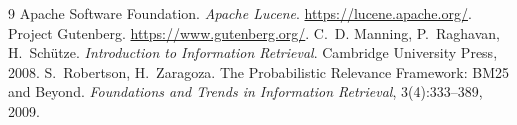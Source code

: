 \documentclass[10pt,a4paper,twocolumn]{article}
\begin{document}
\begin{thebibliography}{9}
\footnotesize\setlength{\itemsep}{1pt}\setlength{\parskip}{0pt}
 Apache Software Foundation. \emph{Apache Lucene}. \url{https://lucene.apache.org/}.
 Project Gutenberg. \url{https://www.gutenberg.org/}.
 C.~D. Manning, P.~Raghavan, H.~Schütze. \emph{Introduction to Information Retrieval}.
  Cambridge University Press, 2008.
 S.~Robertson, H.~Zaragoza. The Probabilistic Relevance Framework: BM25 and Beyond.
  \emph{Foundations and Trends in Information Retrieval}, 3(4):333--389, 2009.
\end{thebibliography}
\end{document}
